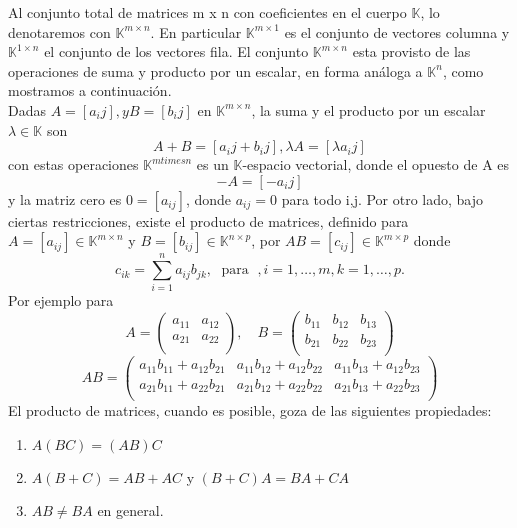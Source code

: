 \documentclass[b5paper, 11pt]{book}
\newcommand{\0}{\mathbf{0}}
\newcommand{\K}{\mathds{K}}
\theoremstyle{estiloB}
\theoremstyle{estiloC}
\theoremstyle{estiloD}
\theoremstyle{estiloE}
\begin{document}
Al conjunto total de matrices m x n con coeficientes en el cuerpo  $\K$, lo denotaremos con $ \K^{m \times n}$. En particular $\K^{m \times 1}$ es el conjunto de vectores columna y $\K^{1 \times n}$ el conjunto de los vectores fila. El conjunto $\K^{m \times n}$ esta provisto de las operaciones de suma y producto por un escalar, en forma an\'{a}loga a $\K^{n}$, como mostramos a continuaci\'{o}n.\\
   Dadas $ A = [a_ij],y B = [b_ij]$ en $\K^{m \times n}$, la suma y el producto por un escalar $\lambda \in \K$ son
\[
 A+B = [a_ij + b_ij], \lambda A = [\lambda a_ij]
\]
con estas operaciones $\K^{m times n}$ es un $\K$-espacio vectorial, donde el opuesto de A es
\[
-A = [-a_ij]
\]
y la matriz cero es $0 = [a_{ij}]$, donde $a_{ij} = 0$ para todo i,j. Por otro lado, bajo ciertas restricciones, existe el producto de matrices, definido para $A = [a_{ij}]\in \K^{m \times n}$ y $B = [b_{ij}] \in \K ^{n \times p}$, por $AB = [c_{ij}] \in  \K^{m  \times p}$ donde $$ c_{ik} = \sum_{i=1}^n a_{ij}b_{jk},\; \text{ para } \;, {i=1},\ldots,m,k=1,\ldots ,p.$$
Por ejemplo para 
\[
A = \left( \begin{array}{lcr}
a_{11} &a_{12}  \\
a_{21} &a_{22}  \\
\end{array}
\right),
\quad
B = \left( \begin{array}{lcr}
b_{11} &b_{12} &b_{13}  \\
b_{21} &b_{22} &b_{23}  \\
\end{array}
\right)
\]
\[
AB = \left( \begin{array}{lcr}
a_{11}b_{11}+a_{12}b_{21} &a_{11}b_{12}+a_{12}b_{22} &a_{11}b_{13}+a_{12}b_{23}  \\
a_{21}b_{11}+a_{22}b_{21} &a_{21}b_{12}+a_{22}b_{22} &a_{21}b_{13}+a_{22}b_{23}  \\
\end{array}
\right)
\]
El producto de matrices, cuando es posible, goza de las siguientes propiedades:
\begin{enumerate}
\item $A(BC) = (AB)C$
\item $A(B+C) = AB + AC$ y $(B+C)A = BA + CA$
\item $AB \not= BA$ en general.
\end{enumerate}
\end{document}

